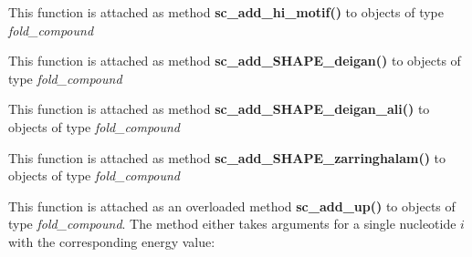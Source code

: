 \begin{DoxyRefList}
\item[\label{wrappers__wrappers000011}%
\Hypertarget{wrappers__wrappers000011}%
Global \mbox{\hyperlink{group__constraints__ligand_gaa6ff0113a3a76dc0b8d62961f4e1dfa0}{vrna\+\_\+sc\+\_\+add\+\_\+hi\+\_\+motif}} (vrna\+\_\+fold\+\_\+compound\+\_\+t $\ast$vc, const char $\ast$seq, const char $\ast$structure, F\+L\+T\+\_\+\+O\+R\+\_\+\+D\+BL energy, unsigned int options)]This function is attached as method {\bfseries sc\+\_\+add\+\_\+hi\+\_\+motif()} to objects of type {\itshape fold\+\_\+compound}  
\item[\label{wrappers__wrappers000012}%
\Hypertarget{wrappers__wrappers000012}%
Global \mbox{\hyperlink{group___s_h_a_p_e__reactivities_ga57d612b58e1c61dd6cfcb5a843f8f1b3}{vrna\+\_\+sc\+\_\+add\+\_\+\+S\+H\+A\+P\+E\+\_\+deigan}} (vrna\+\_\+fold\+\_\+compound\+\_\+t $\ast$vc, const double $\ast$reactivities, double m, double b, unsigned int options)]This function is attached as method {\bfseries sc\+\_\+add\+\_\+\+S\+H\+A\+P\+E\+\_\+deigan()} to objects of type {\itshape fold\+\_\+compound}  
\item[\label{wrappers__wrappers000013}%
\Hypertarget{wrappers__wrappers000013}%
Global \mbox{\hyperlink{group___s_h_a_p_e__reactivities_ga04ba85da63d8c793bb8001d1e6f800ba}{vrna\+\_\+sc\+\_\+add\+\_\+\+S\+H\+A\+P\+E\+\_\+deigan\+\_\+ali}} (vrna\+\_\+fold\+\_\+compound\+\_\+t $\ast$vc, const char $\ast$$\ast$shape\+\_\+files, const int $\ast$shape\+\_\+file\+\_\+association, double m, double b, unsigned int options)]This function is attached as method {\bfseries sc\+\_\+add\+\_\+\+S\+H\+A\+P\+E\+\_\+deigan\+\_\+ali()} to objects of type {\itshape fold\+\_\+compound}  
\item[\label{wrappers__wrappers000014}%
\Hypertarget{wrappers__wrappers000014}%
Global \mbox{\hyperlink{group___s_h_a_p_e__reactivities_gaf3c65a045060aef5c4e41693d30af58c}{vrna\+\_\+sc\+\_\+add\+\_\+\+S\+H\+A\+P\+E\+\_\+zarringhalam}} (vrna\+\_\+fold\+\_\+compound\+\_\+t $\ast$vc, const double $\ast$reactivities, double b, double default\+\_\+value, const char $\ast$shape\+\_\+conversion, unsigned int options)]This function is attached as method {\bfseries sc\+\_\+add\+\_\+\+S\+H\+A\+P\+E\+\_\+zarringhalam()} to objects of type {\itshape fold\+\_\+compound}  
\item[\label{wrappers__wrappers000020}%
\Hypertarget{wrappers__wrappers000020}%
Global \mbox{\hyperlink{group__soft__constraints_ga069915fe203a2c8e522dd37847177a09}{vrna\+\_\+sc\+\_\+add\+\_\+up}} (vrna\+\_\+fold\+\_\+compound\+\_\+t $\ast$vc, int i, F\+L\+T\+\_\+\+O\+R\+\_\+\+D\+BL energy, unsigned int options)]This function is attached as an overloaded method {\bfseries sc\+\_\+add\+\_\+up()} to objects of type {\itshape fold\+\_\+compound}. The method either takes arguments for a single nucleotide $i $ with the corresponding energy value\+: 
$$
\end{DoxyRefList}
